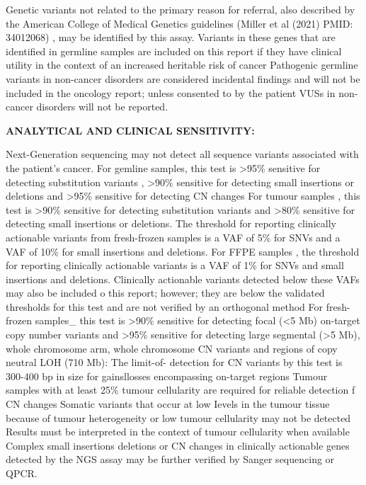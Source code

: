 \documentclass[8pt,letterpaper]{extarticle}
\begin{document}
{Genetic variants not related to the primary reason for referral, also described by the American College of Medical Genetics guidelines (Miller et al (2021) PMID: 34012068) , may be identified by this assay. Variants in these genes that are identified in germline samples are included on this report if they have clinical utility in the context of an increased heritable risk of cancer Pathogenic germline variants in non-cancer disorders are considered incidental findings and will not be included in the oncology report; unless consented to by the patient VUSs in non-cancer disorders will not be reported.

{\bf ANALYTICAL AND CLINICAL SENSITIVITY:}

Next-Generation sequencing may not detect all sequence variants associated with the patient's cancer. For gemline samples, this test is >95\% sensitive for detecting substitution variants , >90\% sensitive for detecting small insertions or deletions and >95\% sensitive for detecting CN changes For tumour samples , this test is >90\% sensitive for detecting substitution variants and >80\% sensitive for detecting small insertions or deletions. The threshold for reporting clinically actionable variants from fresh-frozen samples is a VAF of 5\% for SNVs and a VAF of 10\% for small insertions and deletions. For FFPE samples , the threshold for reporting clinically actionable variants is a VAF of 1\% for SNVs and small insertions and deletions. Clinically actionable variants detected below these VAFs may also be included o this report; however; they are below the validated thresholds for this test and are not verified by an orthogonal method For fresh-frozen samples\_ this test is >90\% sensitive for detecting focal (<5 Mb) on-target copy number variants and >95\% sensitive for detecting large segmental (>5 Mb), whole chromosome arm, whole chromosome CN variants and regions of copy neutral LOH (710 Mb): The limit-of- detection for CN variants by this test is 300-400 bp in size for gainsllosses encompassing on-target regions   Tumour samples with at least 25\% tumour cellularity are required for reliable detection f CN changes  Somatic variants that occur at low Ievels in the tumour tissue because of tumour heterogeneity or low tumour cellularity may not be detected Results must be interpreted in the context of tumour cellularity when available   Complex small insertions deletions or CN changes in clinically actionable genes detected by the NGS assay may be further verified by Sanger sequencing or QPCR.

}
\end{document}
